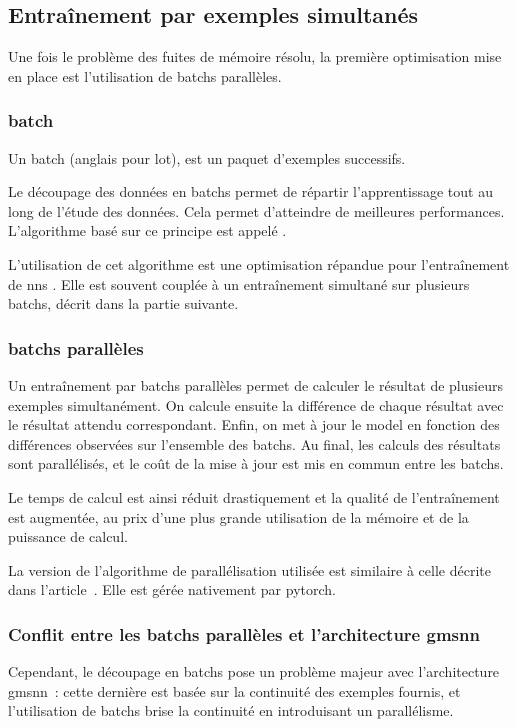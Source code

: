
\newpage
\subsection{Entraînement par exemples simultanés} \label{subsec:optibatch}
Une fois le problème des fuites de mémoire résolu, la première optimisation mise en place est l'utilisation de \glspl{batch} parallèles.

\subsubsection{\Gls{batch}} \label{def:batch}
Un \gls{batch} (anglais pour lot), est un paquet d'exemples successifs.

Le découpage des données en \glspl{batch} permet de répartir l'apprentissage tout au long de l'étude des données.
Cela permet d'atteindre de meilleures performances.
L'algorithme basé sur ce principe est appelé  \autocite{batch}.

L'utilisation de cet algorithme est une optimisation répandue pour l'entraînement de \glspl{nn} \autocite{batch}.
Elle est souvent couplée à un entraînement simultané sur plusieurs \glspl{batch}, décrit dans la partie suivante.

\subsubsection{\Glspl{batch} parallèles}
Un entraînement par \glspl{batch} parallèles permet de calculer le résultat de plusieurs exemples simultanément.
On calcule ensuite la différence de chaque résultat avec le résultat attendu correspondant.
Enfin, on met à jour le \gls{model} en fonction des différences observées sur l'ensemble des \glspl{batch}.
Au final, les calculs des résultats sont parallélisés, et le coût de la mise à jour est mis en commun entre les \glspl{batch}.

Le temps de calcul est ainsi réduit drastiquement et la qualité de l'entraînement est augmentée, au prix d'une plus grande utilisation de la mémoire et de la puissance de calcul.

La version de l'algorithme de parallélisation utilisée est similaire à celle décrite dans l'article~\autocite{batch_parallel}. Elle est gérée nativement par \gls{pytorch}.

\subsubsection{Conflit entre les \glspl{batch} parallèles et l'architecture \gls{gmsnn}}
Cependant, le découpage en \glspl{batch} pose un problème majeur avec l'architecture \gls{gmsnn}~: cette dernière est basée sur la continuité des exemples fournis, et l'utilisation de \glspl{batch} brise la continuité en introduisant un parallélisme.

